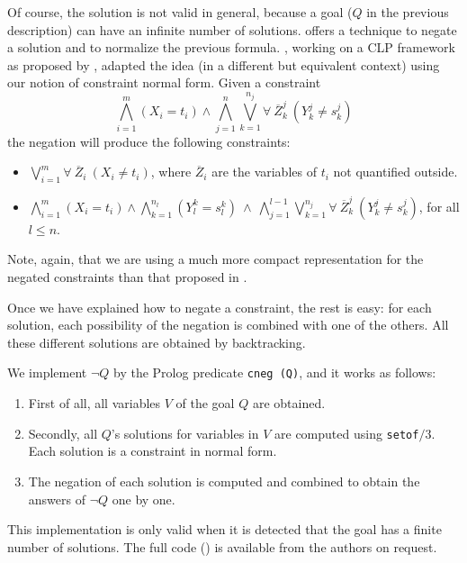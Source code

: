 \documentclass[]{llncs}
\begin{document}
Of course, the solution is not valid in general, because a goal ($Q$
in the previous description) can have an infinite number of solutions.
\cite{Chan1} offers a technique to negate a solution and to normalize
the previous formula.  \cite{Moreno1}, working on a CLP framework as
proposed by \cite{Stuckey}, adapted the idea (in a different but
equivalent context) using our notion of constraint normal form.  Given
a constraint \\[-2ex]
%
%
\begin{displaymath}
  \bigwedge_{i=1}^m (X_i = t_i) \wedge
   \bigwedge_{j=1}^n \bigvee_{k=1}^{n_j}\forall~
   \overline{Z}_k^j~ (Y_k^j \neq s_k^j)
\end{displaymath}
%
%
the negation will produce the following constraints:

\begin{itemize}
\item $\bigvee_{i=1}^m \forall~\overline{Z}_i~ (X_i \neq t_i)$, where
$\overline{Z}_i$ are the variables of $t_i$ not quantified outside.


\item $\bigwedge_{i=1}^m (X_i = t_i) \wedge
       \bigwedge_{k=1}^{n_l} (Y_l^k = s_l^k) ~\wedge~
       \bigwedge_{j=1}^{l-1} \bigvee_{k=1}^{n_j}
       \forall~ \overline{Z}_k^j~
       (Y_k^j \neq s_k^j)$, for all $l \leq n$.

\end{itemize}

Note, again, that we are using a much more compact representation
for the negated constraints than that proposed in \cite{Chan1}.

Once we have explained how to negate a constraint, the rest is
easy: for each solution, each possibility of the negation is
combined with one of the others. All these different solutions
are obtained by backtracking.

We implement $\neg Q$ by the Prolog predicate {\tt cneg (Q)}, and it works
as follows:
\begin{enumerate}
\item First of all, all variables $V$ of the goal $Q$ are obtained.
\item Secondly, all $Q$'s solutions for variables in $V$
are computed using {\tt setof}$/3$. Each solution is a constraint in
normal form.
\item The negation of each solution is computed and
combined to obtain the answers of $\neg Q$ one by one.
\end{enumerate}
This implementation is only valid when it is detected that
the goal has a finite number of solutions.
The full code (\cite{Susana}) is available from the authors on request.
\end{document}

